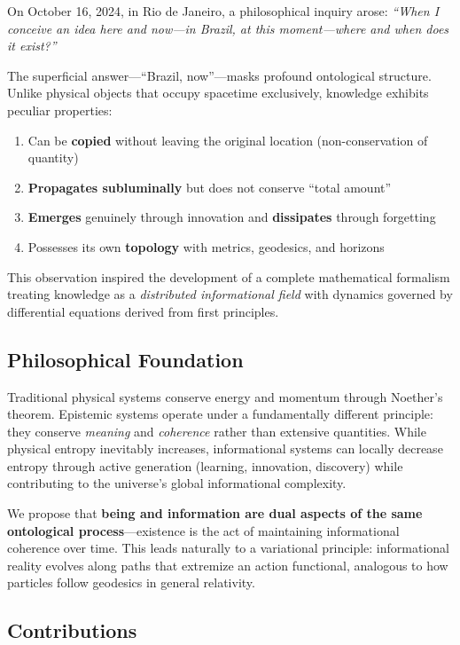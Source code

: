\documentclass[12pt]{article}
\begin{document}
On October 16, 2024, in Rio de Janeiro, a philosophical inquiry arose: \emph{``When I conceive an idea here and now---in Brazil, at this moment---where and when does it exist?''}

The superficial answer---``Brazil, now''---masks profound ontological structure. Unlike physical objects that occupy spacetime exclusively, knowledge exhibits peculiar properties:
\begin{enumerate}
    \item Can be \textbf{copied} without leaving the original location (non-conservation of quantity)
    \item \textbf{Propagates subluminally} but does not conserve ``total amount''
    \item \textbf{Emerges} genuinely through innovation and \textbf{dissipates} through forgetting
    \item Possesses its own \textbf{topology} with metrics, geodesics, and horizons
\end{enumerate}

This observation inspired the development of a complete mathematical formalism treating knowledge as a \emph{distributed informational field} with dynamics governed by differential equations derived from first principles.

\subsection{Philosophical Foundation}

Traditional physical systems conserve energy and momentum through Noether's theorem. Epistemic systems operate under a fundamentally different principle: they conserve \emph{meaning} and \emph{coherence} rather than extensive quantities. While physical entropy inevitably increases, informational systems can locally decrease entropy through active generation (learning, innovation, discovery) while contributing to the universe's global informational complexity.

We propose that \textbf{being and information are dual aspects of the same ontological process}---existence is the act of maintaining informational coherence over time. This leads naturally to a variational principle: informational reality evolves along paths that extremize an action functional, analogous to how particles follow geodesics in general relativity.

\subsection{Contributions}
\end{document}
